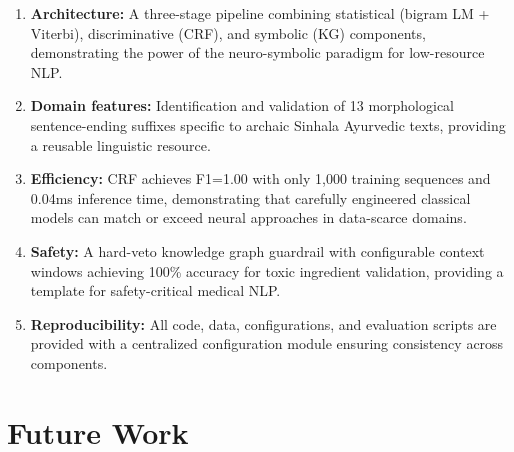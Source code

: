 \documentclass[12pt, a4paper, twoside]{report}
\begin{document}
\begin{enumerate}
    \item \textbf{Architecture:} A three-stage pipeline combining statistical (bigram LM + Viterbi), discriminative (CRF), and symbolic (KG) components, demonstrating the power of the neuro-symbolic paradigm for low-resource NLP.
    
    \item \textbf{Domain features:} Identification and validation of 13 morphological sentence-ending suffixes specific to archaic Sinhala Ayurvedic texts, providing a reusable linguistic resource.
    
    \item \textbf{Efficiency:} CRF achieves F1=1.00 with only 1,000 training sequences and 0.04ms inference time, demonstrating that carefully engineered classical models can match or exceed neural approaches in data-scarce domains.
    
    \item \textbf{Safety:} A hard-veto knowledge graph guardrail with configurable context windows achieving 100\% accuracy for toxic ingredient validation, providing a template for safety-critical medical NLP.
    
    \item \textbf{Reproducibility:} All code, data, configurations, and evaluation scripts are provided with a centralized configuration module ensuring consistency across components.
\end{enumerate}

\section{Future Work}
\label{sec:future}
\end{document}
